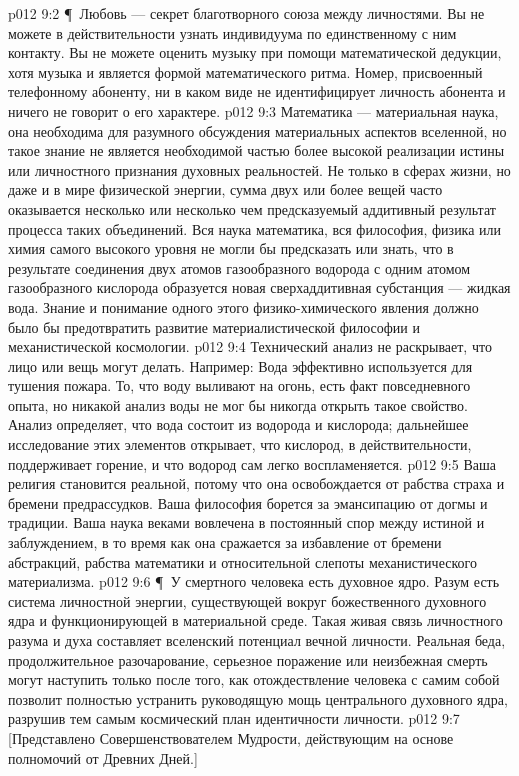\vs p012 9:2 \P\ Любовь --- секрет благотворного союза между личностями. Вы не можете в действительности узнать индивидуума по единственному с ним контакту. Вы не можете оценить музыку при помощи математической дедукции, хотя музыка и является формой математического ритма. Номер, присвоенный телефонному абоненту, ни в каком виде не идентифицирует личность абонента и ничего не говорит о его характере.
\vs p012 9:3 Математика --- материальная наука, она необходима для разумного обсуждения материальных аспектов вселенной, но такое знание не является необходимой частью более высокой реализации истины или личностного признания духовных реальностей. Не только в сферах жизни, но даже и в мире физической энергии, сумма двух или более вещей часто оказывается несколько  или несколько  чем предсказуемый аддитивный результат процесса таких объединений. Вся наука математика, вся философия, физика или химия самого высокого уровня не могли бы предсказать или знать, что в результате соединения двух атомов газообразного водорода с одним атомом газообразного кислорода образуется новая сверхаддитивная субстанция --- жидкая вода. Знание и понимание одного этого физико\hyp{}химического явления должно было бы предотвратить развитие материалистической философии и механистической космологии.
\vs p012 9:4 Технический анализ не раскрывает, что лицо или вещь могут делать. Например: Вода эффективно используется для тушения пожара. То, что воду выливают на огонь, есть факт повседневного опыта, но никакой анализ воды не мог бы никогда открыть такое свойство. Анализ определяет, что вода состоит из водорода и кислорода; дальнейшее исследование этих элементов открывает, что кислород, в действительности, поддерживает горение, и что водород сам легко воспламеняется.
\vs p012 9:5 Ваша религия становится реальной, потому что она освобождается от рабства страха и бремени предрассудков. Ваша философия борется за эмансипацию от догмы и традиции. Ваша наука веками вовлечена в постоянный спор между истиной и заблуждением, в то время как она сражается за избавление от бремени абстракций, рабства математики и относительной слепоты механистического материализма.
\vs p012 9:6 \P\ У смертного человека есть духовное ядро. Разум есть система личностной энергии, существующей вокруг божественного духовного ядра и функционирующей в материальной среде. Такая живая связь личностного разума и духа составляет вселенский потенциал вечной личности. Реальная беда, продолжительное разочарование, серьезное поражение или неизбежная смерть могут наступить только после того, как отождествление человека с самим собой позволит полностью устранить руководящую мощь центрального духовного ядра, разрушив тем самым космический план идентичности личности.
\vs p012 9:7 [Представлено Совершенствователем Мудрости, действующим на основе полномочий от Древних Дней.]
